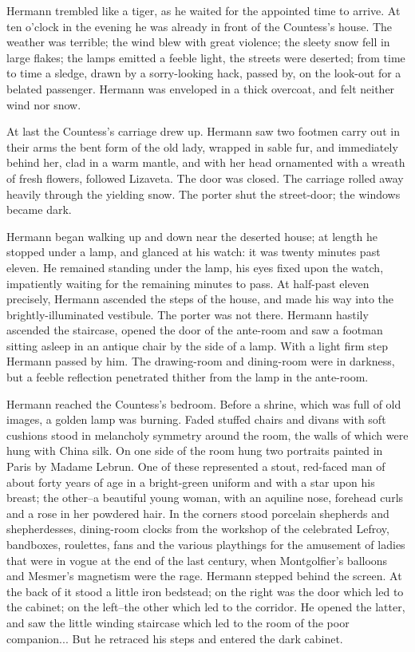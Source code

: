 Hermann trembled like a tiger, as he waited for the appointed time to
arrive. At ten o'clock in the evening he was already in front of the
Countess's house. The weather was terrible; the wind blew with great
violence; the sleety snow fell in large flakes; the lamps emitted a
feeble light, the streets were deserted; from time to time a sledge,
drawn by a sorry-looking hack, passed by, on the look-out for a
belated passenger. Hermann was enveloped in a thick overcoat, and felt
neither wind nor snow.

At last the Countess's carriage drew up. Hermann saw two footmen carry
out in their arms the bent form of the old lady, wrapped in sable fur,
and immediately behind her, clad in a warm mantle, and with her head
ornamented with a wreath of fresh flowers, followed Lizaveta. The door
was closed. The carriage rolled away heavily through the yielding
snow. The porter shut the street-door; the windows became dark.

Hermann began walking up and down near the deserted house; at length
he stopped under a lamp, and glanced at his watch: it was twenty
minutes past eleven. He remained standing under the lamp, his eyes
fixed upon the watch, impatiently waiting for the remaining minutes to
pass. At half-past eleven precisely, Hermann ascended the steps of the
house, and made his way into the brightly-illuminated vestibule. The
porter was not there. Hermann hastily ascended the staircase, opened
the door of the ante-room and saw a footman sitting asleep in an
antique chair by the side of a lamp. With a light firm step Hermann
passed by him. The drawing-room and dining-room were in darkness, but
a feeble reflection penetrated thither from the lamp in the ante-room.

Hermann reached the Countess's bedroom. Before a shrine, which was
full of old images, a golden lamp was burning. Faded stuffed chairs
and divans with soft cushions stood in melancholy symmetry around the
room, the walls of which were hung with China silk. On one side of the
room hung two portraits painted in Paris by Madame Lebrun. One of
these represented a stout, red-faced man of about forty years of age
in a bright-green uniform and with a star upon his breast; the
other--a beautiful young woman, with an aquiline nose, forehead curls
and a rose in her powdered hair. In the corners stood porcelain
shepherds and shepherdesses, dining-room clocks from the workshop of
the celebrated Lefroy, bandboxes, roulettes, fans and the various
playthings for the amusement of ladies that were in vogue at the end
of the last century, when Montgolfier's balloons and Mesmer's
magnetism were the rage. Hermann stepped behind the screen. At the
back of it stood a little iron bedstead; on the right was the door
which led to the cabinet; on the left--the other which led to the
corridor. He opened the latter, and saw the little winding staircase
which led to the room of the poor companion... But he retraced his
steps and entered the dark cabinet.

